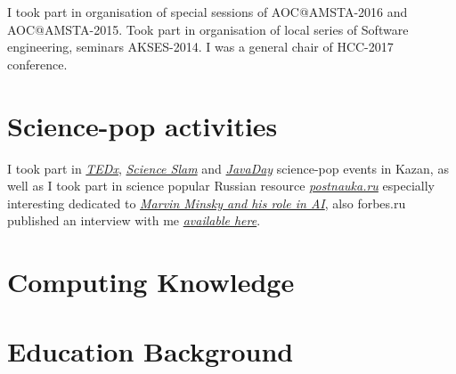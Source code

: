 \documentclass{moderncv}
\begin{document}
I took part in organisation of special sessions of AOC@AMSTA-2016 and AOC@AMSTA-2015. Took part in organisation of local series of Software engineering, seminars AKSES-2014. I was a general chair of HCC-2017 conference.

\section{Science-pop activities}

I took part in \href{https://www.youtube.com/watch?v=BLvS7h3kRbo}{\emph{TEDx}}, \href{https://vk.com/video-87488544_171504962}{\emph{Science Slam}} and \href{https://www.youtube.com/watch?v=sLLKxvUEA7E}{\emph{JavaDay}} science-pop events in Kazan, as well as I took part in science popular Russian resource \href{https://postnauka.ru/author/talanov}{\emph{postnauka.ru}} especially interesting dedicated to \href{https://postnauka.ru/faq/58727}{\emph{Marvin Minsky and his role in AI}}, also forbes.ru published an interview with me \href{http://www.forbes.ru/mneniya-column/288097-kak-sozdat-emotsionalnyi-iskusstvennyi-intellekt}{\emph{available here}}.

\section{Computing Knowledge}



\section{Education Background}

\end{document}

